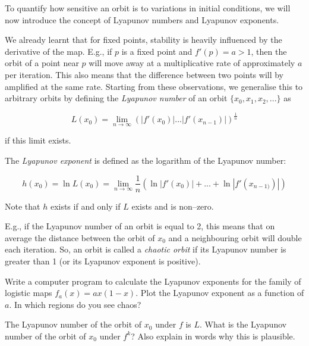 To quantify how sensitive an orbit is to variations in initial conditions, we will now introduce the concept of Lyapunov numbers and Lyapunov exponents.

We already learnt that for fixed points, stability is heavily influenced by the derivative of the map. E.g., if $p$ is a fixed point and $f'(p)=a > 1$, then the orbit of a point near $p$ will move away at a multiplicative rate of approximately $a$ per iteration. This also means that the difference between two points will by amplified at the same rate. Starting from these observations, we generalise this to arbitrary orbits by defining the \emph{Lyapunov number} of an orbit $\{x_0, x_1, x_2, ... \}$ as

\begin{equation}
L(x_0) = \lim _{n \to \infty}\left(\left|f'(x_0)\right|...\left|f'(x_{n-1})\right|\right)^{\frac{1}{n}}
\end{equation} 

if this limit exists.

The \emph{Lyapunov exponent} is defined as the logarithm of the Lyapunov number:

\begin{equation}
h(x_0) = \ln L(x_0) = \lim _{n \to \infty}\frac{1}{n}\left(\ln\left|f'(x_0)\right| + ... + \ln\left|f'(x_{n-1)})\right|\right)
\end{equation} 

Note that $h$ exists if and only if $L$ exists and is non--zero.

E.g., if the Lyapunov number of an orbit is equal to 2, this means that on average the distance between the orbit of $x_0$ and a neighbouring orbit will double each iteration. So, an orbit is called a \emph{chaotic orbit} if its Lyapunov number is greater than 1 (or its Lyapunov exponent is positive). 

\begin{sidebar}
\begin{ex}
Write a computer program to calculate the Lyapunov exponents for the family of logistic maps $f_a(x)=ax(1-x)$. Plot the Lyapunov exponent as a function of $a$. In which regions do you see chaos?
\end{ex}
\end{sidebar}

\begin{sidebar}
\begin{ex}
The Lyapunov number of the orbit of $x_0$ under $f$ is $L$. What is the Lyapunov number of the orbit of $x_0$ under $f^k$? Also explain in words why this is plausible.
\end{ex}
\end{sidebar}

